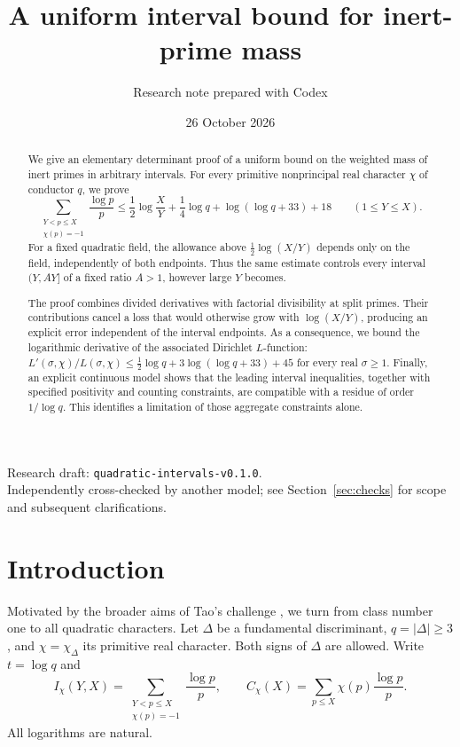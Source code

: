 \documentclass[11pt]{article}
\title{A uniform interval bound for inert-prime mass}
\author{Research note prepared with Codex}
\date{26 October 2026}
\begin{document}
\maketitle
\begin{center}\small
Research draft: \texttt{quadratic-intervals-v0.1.0}.\\
Independently cross-checked by another model;
see Section~\ref{sec:checks} for scope and subsequent clarifications.
\end{center}

\begin{abstract}
We give an elementary determinant proof of a uniform bound on the
weighted mass of inert primes in arbitrary intervals. For every
primitive nonprincipal real character $\chi$ of conductor $q$, we prove
\[
 \sum_{\substack{Y<p\le X\\\chi(p)=-1}}\frac{\log p}{p}
 \le \frac12\log\frac XY+\frac14\log q
       +\log(\log q+33)+18\qquad(1\le Y\le X).
\]
For a fixed quadratic field, the allowance above $\tfrac12\log(X/Y)$
depends only on the field, independently of both endpoints. Thus the
same estimate controls every interval $(Y,AY]$ of a fixed ratio $A>1$,
however large $Y$ becomes.

The proof combines divided derivatives with factorial divisibility at
split primes. Their contributions cancel a loss that would otherwise
grow with $\log(X/Y)$, producing an explicit error independent of the
interval endpoints. As a consequence, we bound the logarithmic
derivative of the associated Dirichlet $L$-function:
$L'(\sigma,\chi)/L(\sigma,\chi)
\le\frac12\log q+3\log(\log q+33)+45$ for every real $\sigma\ge1$.
Finally, an explicit continuous model shows that the leading interval
inequalities, together with specified positivity and counting
constraints, are compatible with a residue of order $1/\log q$.
This identifies a limitation of those aggregate constraints alone.
\end{abstract}

\section{Introduction}
Motivated by the broader aims of Tao's challenge \cite{tao}, we turn
from class number one to all quadratic characters.
Let $\Delta$ be a fundamental discriminant, $q=|\Delta|\ge3$, and
$\chi=\chi_\Delta$ its primitive real character. Both signs of
$\Delta$ are allowed. Write $t=\log q$ and
\[
 I_\chi(Y,X)=\sum_{\substack{Y<p\le X\\\chi(p)=-1}}\frac{\log p}{p},
 \qquad C_\chi(X)=\sum_{p\le X}\chi(p)\frac{\log p}{p}.
\]
All logarithms are natural.
\end{document}
